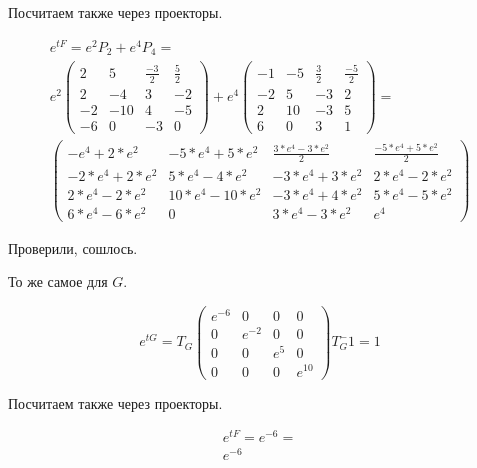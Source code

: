 \documentclass[12pt, a4paper]{article}
\begin{document}
    Посчитаем также через проекторы.

    \begin{multline}
        e^{t F} = e^2 P_2 + e^4 P_4 = \\
        e^2 \left(\begin{matrix}
            2 & 5 & \frac{-3}{2} & \frac{5}{2} \\
            2 & -4 & 3 & -2 \\
            -2 & -10 & 4 & -5 \\
            -6 & 0 & -3 & 0
        \end{matrix}\right) + e^4 \left(\begin{matrix}
            -1 & -5 & \frac{3}{2} & \frac{-5}{2} \\
            -2 & 5 & -3 & 2 \\
            2 & 10 & -3 & 5 \\
            6 & 0 & 3 & 1
        \end{matrix}\right) = \\
        \left(\begin{matrix}
            -e^4+2*e^2 & -5*e^4+5*e^2 & \frac{3*e^4-3*e^2}{2} & \frac{-5*e^4+5*e^2}{2} \\
            -2*e^4+2*e^2 & 5*e^4-4*e^2 & -3*e^4+3*e^2 & 2*e^4-2*e^2 \\
            2*e^4-2*e^2 & 10*e^4-10*e^2 & -3*e^4+4*e^2 & 5*e^4-5*e^2 \\
            6*e^4-6*e^2 & 0 & 3*e^4-3*e^2 & e^4
        \end{matrix}\right)
    \end{multline}

    Проверили, сошлось.

    То же самое для $G$.

    \begin{equation}
        e^{t G} = T_G \left(\begin{matrix}
            e^{-6} & 0 & 0 & 0 \\
            0 & e^{-2} & 0 & 0 \\
            0 & 0 & e^{5} & 0 \\
            0 & 0 & 0 & e^{10}
        \end{matrix}\right) T_G^-1 = 1

    \end{equation}

    Посчитаем также через проекторы.

    \begin{multline}
        e^{t F} = e^{-6} = \\
        e^{-6}
    \end{multline}
\end{document}
